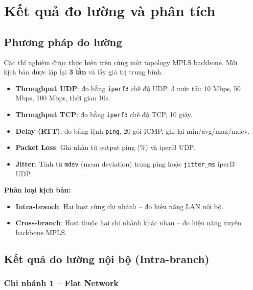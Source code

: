 \chapter{Kết quả đo lường và phân tích}

\section{Phương pháp đo lường}

Các thí nghiệm được thực hiện trên cùng một topology MPLS backbone.
Mỗi kịch bản được lặp lại \textbf{3 lần} và lấy giá trị trung bình.

\begin{itemize}
    \item \textbf{Throughput UDP}: đo bằng \texttt{iperf3} chế độ UDP,
          3 mức tải: 10 Mbps, 50 Mbps, 100 Mbps, thời gian 10s.
    \item \textbf{Throughput TCP}: đo bằng \texttt{iperf3} chế độ TCP, 10 giây.
    \item \textbf{Delay (RTT)}: đo bằng lệnh \texttt{ping}, 20 gói ICMP, ghi lại min/avg/max/mdev.
    \item \textbf{Packet Loss}: Ghi nhận từ output ping (\%) và iperf3 UDP.
    \item \textbf{Jitter}: Tính từ \texttt{mdev} (mean deviation) trong ping hoặc \texttt{jitter\_ms} iperf3 UDP.
\end{itemize}

\textbf{Phân loại kịch bản:}
\begin{itemize}
    \item \textbf{Intra-branch}: Hai host cùng chi nhánh -- đo hiệu năng LAN nội bộ.
    \item \textbf{Cross-branch}: Host thuộc hai chi nhánh khác nhau -- đo hiệu năng xuyên backbone MPLS.
\end{itemize}

\section{Kết quả đo lường nội bộ (Intra-branch)}

\subsection{Chi nhánh 1 -- Flat Network}

